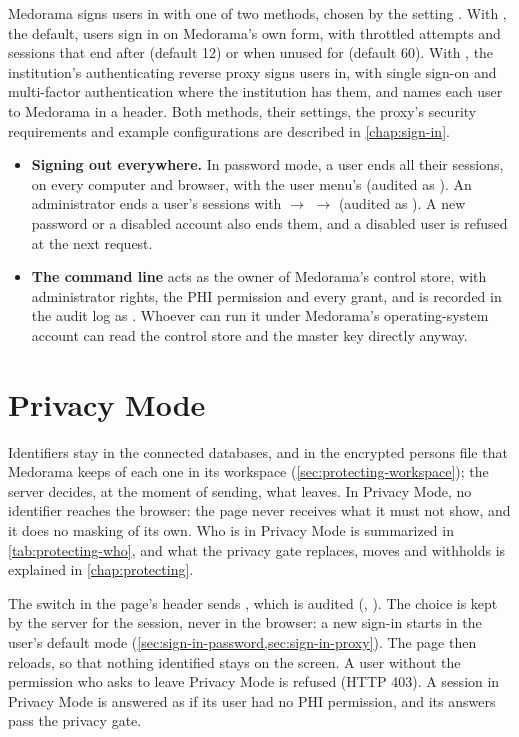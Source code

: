 Medorama signs users in with one of two methods, chosen by the setting .
With , the default, users sign in on Medorama's own form, with throttled attempts
and sessions that end after  (default 12) or when unused for
 (default 60). With , the institution's authenticating
reverse proxy signs users in, with single sign-on and multi-factor authentication where the
institution has them, and names each user to Medorama in a header. Both methods, their settings,
the proxy's security requirements and example configurations are described in
\cref{chap:sign-in}.
\begin{itemize}
\item \textbf{Signing out everywhere.} In password mode, a user ends all their sessions, on every
  computer and browser, with the user menu's  (audited as
  ). An administrator ends a user's sessions with 
  $\rightarrow$  $\rightarrow$  (audited as ). A new
  password or a disabled account also ends them, and a disabled user is refused at the next
  request.
\item \textbf{The command line} acts as the owner of Medorama's control store, with
  administrator rights, the PHI permission and every grant, and is recorded in the audit log as
  . Whoever can run it under Medorama's operating-system account can read the
  control store and the master key directly anyway.
\end{itemize}

\section{Privacy Mode}
\label{sec:users-privacy-mode}

Identifiers stay in the connected databases, and in the encrypted persons file that Medorama
keeps of each one in its workspace (\cref{sec:protecting-workspace}); the server decides, at the
moment of sending, what leaves. In Privacy Mode, no identifier reaches the browser: the page never receives
what it must not show, and it does no masking of its own. Who is in Privacy Mode is summarized in
\cref{tab:protecting-who}, and what the privacy gate replaces, moves and withholds is explained in
\cref{chap:protecting}.

The  switch in the page's header sends , which is audited
(, ). The choice is kept by the server for the session,
never in the browser: a new sign-in starts in the user's default mode
(\cref{sec:sign-in-password,sec:sign-in-proxy}). The page then reloads, so that nothing
identified stays on the screen. A user without the permission who asks
to leave Privacy Mode is refused (HTTP 403). A session in Privacy Mode is answered as if its user
had no PHI permission, and its answers pass the privacy gate.

